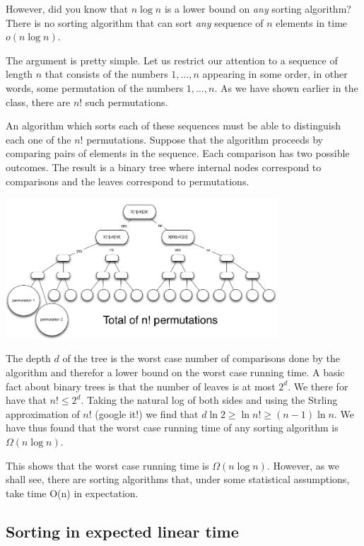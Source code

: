 However, did you know that $n \log n$ is a lower bound on {\em any} sorting
algorithm? There is no sorting algorithm that can sort {\em any}
sequence of $n$ elements in time $o(n\log n)$. 

The argument is pretty simple. Let us restrict our attention to a
sequence of length $n$ that consists of the numbers $1,\ldots,n$
appearing in some order,  in other words, some permutation of the
numbers $1,\ldots,n$. As we have shown earlier in the class, there are
$n!$ such permutations.

An algorithm which sorts each of these sequences must be able to
distinguish each one of the $n!$ permutations. Suppose that the
algorithm proceeds by comparing pairs of elements in the
sequence. Each comparison has two possible outcomes. The result is a
binary tree where internal nodes correspond to comparisons and the
leaves correspond to permutations.

\begin{center}
\includegraphics[width=4in]{figs/SortingLowerBound.png}
\end{center}

The depth $d$ of the tree is the worst case number of comparisons done by
the algorithm and therefor a lower bound on the worst case running
time. A basic fact about binary trees is that the number of leaves is
at most $2^d$. We there for have that $n! \leq 2^d$. Taking the
natural log of both sides and using the Strling approximation of 
$n!$ (google it!) we
find that $d \ln 2 \geq \ln n! \geq (n-1) \ln n$. We have thus found that the
worst case running time of any sorting algorithm is $\Omega(n \log n)$.

This shows that the worst case running time is $\Omega(n \log
n)$. However, as we shall see, there are sorting algorithms that,
under some statistical assumptions, take time O(n) in expectation.

\subsection{Sorting in expected linear time}

